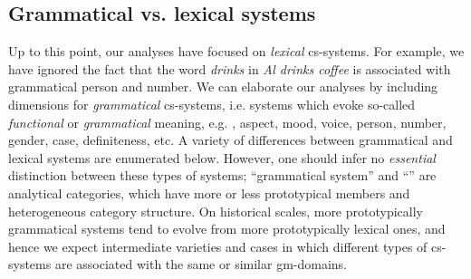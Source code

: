 \subsection{Grammatical vs. lexical systems}

Up to this point, our analyses have focused on \textit{lexical} cs-systems. For example, we have ignored the fact that the word \textit{drinks} in \textit{Al drinks coffee} is associated with grammatical person and number. We can elaborate our analyses by including  dimensions for \textit{grammatical} cs-systems, i.e. systems which evoke so-called \textit{functional} or \textit{grammatical} meaning, e.g. , aspect, mood, voice, person, number, gender, case, definiteness, etc. A variety of differences between grammatical and lexical systems are enumerated below. However, one should infer no \textit{essential} distinction between these types of systems; “grammatical system” and “” are analytical categories, which have more or less prototypical members and heterogeneous category structure. On historical scales, more prototypically grammatical systems tend to evolve from more prototypically lexical ones, and hence we expect intermediate varieties and cases in which different types of cs-systems are associated with the same or similar gm-domains. 

